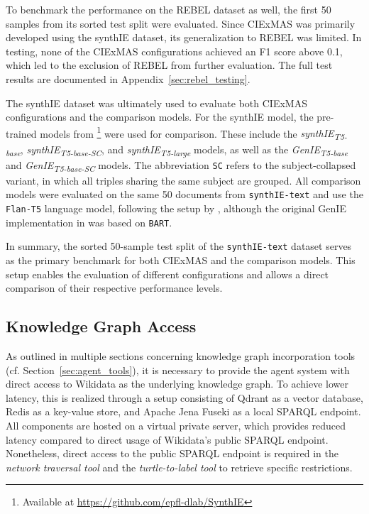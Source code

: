 \documentclass[a4paper,oneside,bibliography=totoc]{scrbook}
\begin{document}
To benchmark the performance on the REBEL dataset as well, the first 50 samples from its sorted test split were evaluated. Since CIExMAS was primarily developed using the synthIE dataset, its generalization to REBEL was limited. In testing, none of the CIExMAS configurations achieved an F1 score above 0.1, which led to the exclusion of REBEL from further evaluation. The full test results are documented in Appendix~\ref{sec:rebel_testing}.

The synthIE dataset was ultimately used to evaluate both CIExMAS configurations and the comparison models. For the synthIE model, the pre-trained models from \citet{Josifoski2023}\footnote{Available at \url{https://github.com/epfl-dlab/SynthIE}} were used for comparison. These include the \textit{synthIE\textsubscript{T5-base}}, \textit{synthIE\textsubscript{T5-base-SC}}, and \textit{synthIE\textsubscript{T5-large}} models, as well as the \textit{GenIE\textsubscript{T5-base}} and \textit{GenIE\textsubscript{T5-base-SC}} models. The abbreviation \texttt{SC} refers to the subject-collapsed variant, in which all triples sharing the same subject are grouped. All comparison models were evaluated on the same 50 documents from \texttt{synthIE-text} and use the \texttt{Flan-T5} language model, following the setup by \citet{Josifoski2023}, although the original GenIE implementation in \citet{Josifoski2021} was based on \texttt{BART}.

In summary, the sorted 50-sample test split of the \texttt{synthIE-text} dataset serves as the primary benchmark for both CIExMAS and the comparison models. This setup enables the evaluation of different configurations and allows a direct comparison of their respective performance levels.

\subsection{Knowledge Graph Access}
\label{subsec:knowledge_graph_access}

As outlined in multiple sections concerning knowledge graph incorporation tools (cf. Section~\ref{sec:agent_tools}), it is necessary to provide the agent system with direct access to Wikidata as the underlying knowledge graph. To achieve lower latency, this is realized through a setup consisting of Qdrant as a vector database, Redis as a key-value store, and Apache Jena Fuseki as a local \ac{SPARQL} endpoint. All components are hosted on a virtual private server, which provides reduced latency compared to direct usage of Wikidata’s public \ac{SPARQL} endpoint. Nonetheless, direct access to the public \ac{SPARQL} endpoint is required in the \textit{network traversal tool} and the \textit{turtle-to-label tool} to retrieve specific restrictions.
\end{document}
